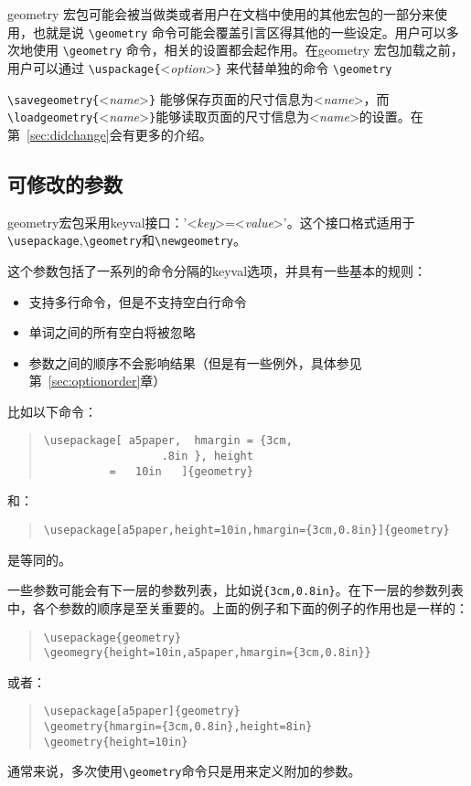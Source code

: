 \documentclass[titlepage]{ctexart}
\def\Gm{\textsf{geometry}}
\begin{document}
	 \Gm{} 宏包可能会被当做类或者用户在文档中使用的其他宏包的一部分来使用，也就是说 \verb|\geometry| 命令可能会覆盖引言区得其他的一些设定。用户可以多次地使用 \verb|\geometry| 命令，相关的设置都会起作用。在\Gm{} 宏包加载之前，用户可以通过 \verb|\uspackage{|<\emph{option}>\verb|}| 来代替单独的命令 \verb|\geometry|
	 
	 \medskip
	 \verb|\savegeometry{|<\emph{name}>\verb|}| 能够保存页面的尺寸信息为<\emph{name}>，而\verb|\loadgeometry{|<\emph{name}>\verb|}|能够读取页面的尺寸信息为<\emph{name}>的设置。在第~\ref{sec:didchange}会有更多的介绍。
	 
	 \subsection{可修改的参数}
	 \Gm 宏包采用\textsf{keyval}接口：'<\emph{key}>=<\emph{value}>'。这个接口格式适用于\verb|\usepackage|,\verb|\geometry|和\verb|\newgeometry|。
	 
	 这个参数包括了一系列的命令分隔的\textsf{keyval}选项，并具有一些基本的规则：
	 \begin{itemize}\setlength{\itemsep}{-0.5\parsep}
	 \item 支持多行命令，但是不支持空白行命令
	 \item 单词之间的所有空白将被忽略
	 \item 参数之间的顺序不会影响结果（但是有一些例外，具体参见第~\ref{sec:optionorder}章）
	 \end{itemize}
	 比如以下命令：
	 \begin{quote}
	 \verb|\usepackage[ a5paper,  hmargin = {3cm,|\\
	 \verb|                  .8in }, height|\\
	 \verb|          =   10in   ]{geometry}|
	 \end{quote}
	 和：
	 \begin{quote}
	 \verb|\usepackage[a5paper,height=10in,hmargin={3cm,0.8in}]{geometry}|
	 \end{quote}
	 是等同的。
	 
	 一些参数可能会有下一层的参数列表，比如说\verb|{3cm,0.8in}|。在下一层的参数列表中，各个参数的顺序是至关重要的。上面的例子和下面的例子的作用也是一样的：
	 \begin{quote}
	 \verb|\usepackage{geometry}|\\
	 \verb|\geomegry{height=10in,a5paper,hmargin={3cm,0.8in}}|
	 \end{quote}
	 或者：
	 \begin{quote}
	 \verb|\usepackage[a5paper]{geometry}|\\
	 \verb|\geometry{hmargin={3cm,0.8in},height=8in}|\\
	 \verb|\geometry{height=10in}|
	 \end{quote}
	 通常来说，多次使用\verb|\geometry|命令只是用来定义附加的参数。
	 
\end{document}
